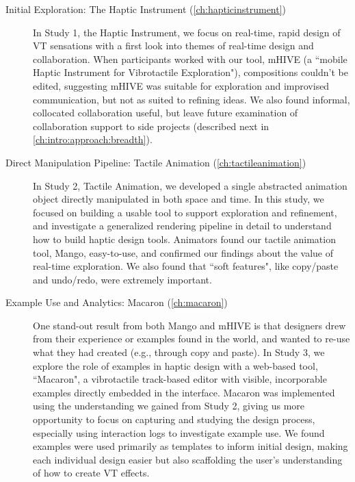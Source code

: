 \begin{description}

\item[Initial Exploration: The Haptic Instrument (\autoref{ch:hapticinstrument})]
In Study 1, the Haptic Instrument, we focus on real-time, rapid design of VT sensations with a first look into themes of real-time design and collaboration.
When participants worked with our tool, mHIVE (a ``mobile Haptic Instrument for Vibrotactile Exploration"), compositions couldn't be edited, suggesting mHIVE was suitable for exploration and improvised communication, but not as suited to refining ideas.
We also found informal, collocated collaboration useful, but leave future examination of collaboration support to side projects (described next in \autoref{ch:intro:approach:breadth}).

\item[Direct Manipulation Pipeline: Tactile Animation (\autoref{ch:tactileanimation})]
In Study 2, Tactile Animation, we developed a single abstracted animation object directly manipulated in both space and time.
In this study, we focused on building a usable tool to support exploration and refinement, and investigate a generalized rendering pipeline in detail to understand how to build haptic design tools.
Animators found our tactile animation tool, Mango, easy-to-use, and confirmed our findings about the value of real-time exploration.
We also found that ``soft features", like copy/paste and undo/redo, were extremely important.

\item[Example Use and Analytics: Macaron (\autoref{ch:macaron})]
One stand-out result from both Mango and mHIVE is that designers drew from their experience or examples found in the world, and wanted to re-use what they had created (e.g., through copy and paste).
In Study 3, we explore the role of examples in haptic design with a web-based tool, ``Macaron", a vibrotactile track-based editor with visible, incorporable examples directly embedded in the interface.
Macaron was implemented using the understanding we gained from Study 2, giving us more opportunity to focus on capturing and studying the design process, especially using interaction logs to investigate example use.
We found examples were used primarily as templates to inform initial design, making each individual design easier but also scaffolding the user's understanding of how to create VT effects.

\end{description}



